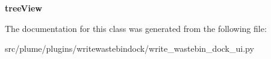 \begin{DoxyCompactItemize}
\item 
{\bfseries tree\+View}\hypertarget{classplume-creator_1_1src_1_1plume_1_1plugins_1_1writewastebindock_1_1write__wastebin__dock__ui_1_1_ui___write_wastebin_dock_aeb5f907537071778f3c04ac89a49d6cf}{}\label{classplume-creator_1_1src_1_1plume_1_1plugins_1_1writewastebindock_1_1write__wastebin__dock__ui_1_1_ui___write_wastebin_dock_aeb5f907537071778f3c04ac89a49d6cf}

\end{DoxyCompactItemize}


The documentation for this class was generated from the following file\+:\begin{DoxyCompactItemize}
\item 
src/plume/plugins/writewastebindock/write\+\_\+wastebin\+\_\+dock\+\_\+ui.\+py\end{DoxyCompactItemize}
